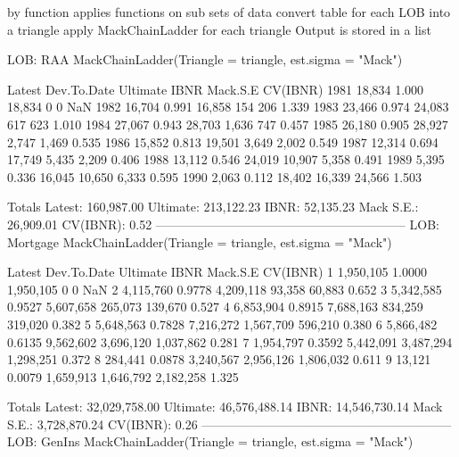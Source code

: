 \documentclass[a4paper]{article}
\begin{document}
by function applies functions on sub sets of data
convert table for each LOB into a triangle
apply MackChainLadder for each triangle
Output is stored in a list
\begin{Schunk}
\begin{Soutput}
LOB: RAA
MackChainLadder(Triangle = triangle, est.sigma = "Mack")

     Latest Dev.To.Date Ultimate   IBNR Mack.S.E CV(IBNR)
1981 18,834       1.000   18,834      0        0      NaN
1982 16,704       0.991   16,858    154      206    1.339
1983 23,466       0.974   24,083    617      623    1.010
1984 27,067       0.943   28,703  1,636      747    0.457
1985 26,180       0.905   28,927  2,747    1,469    0.535
1986 15,852       0.813   19,501  3,649    2,002    0.549
1987 12,314       0.694   17,749  5,435    2,209    0.406
1988 13,112       0.546   24,019 10,907    5,358    0.491
1989  5,395       0.336   16,045 10,650    6,333    0.595
1990  2,063       0.112   18,402 16,339   24,566    1.503

               Totals
Latest:    160,987.00
Ultimate:  213,122.23
IBNR:       52,135.23
Mack S.E.:  26,909.01
CV(IBNR):        0.52
------------------------------------------------------------ 
LOB: Mortgage
MackChainLadder(Triangle = triangle, est.sigma = "Mack")

     Latest Dev.To.Date  Ultimate      IBNR  Mack.S.E CV(IBNR)
1 1,950,105      1.0000 1,950,105         0         0      NaN
2 4,115,760      0.9778 4,209,118    93,358    60,883    0.652
3 5,342,585      0.9527 5,607,658   265,073   139,670    0.527
4 6,853,904      0.8915 7,688,163   834,259   319,020    0.382
5 5,648,563      0.7828 7,216,272 1,567,709   596,210    0.380
6 5,866,482      0.6135 9,562,602 3,696,120 1,037,862    0.281
7 1,954,797      0.3592 5,442,091 3,487,294 1,298,251    0.372
8   284,441      0.0878 3,240,567 2,956,126 1,806,032    0.611
9    13,121      0.0079 1,659,913 1,646,792 2,182,258    1.325

                  Totals
Latest:    32,029,758.00
Ultimate:  46,576,488.14
IBNR:      14,546,730.14
Mack S.E.:  3,728,870.24
CV(IBNR):           0.26
------------------------------------------------------------ 
LOB: GenIns
MackChainLadder(Triangle = triangle, est.sigma = "Mack")


\end{Soutput}
\end{Schunk}
\end{document}

